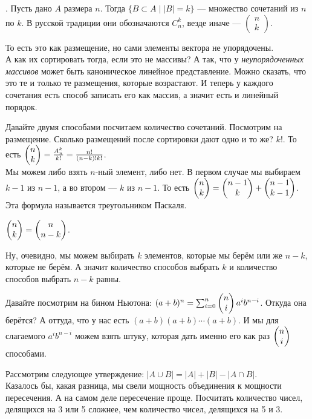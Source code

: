 \documentclass{article}
\begin{document}
\begin{itemize}
\begin{Example}
        \end{Example}
        \dfn {}. Пусть дано $A$ размера $n$. Тогда $\{B\subset A\mid |B|=k\}$ --- множество сочетаний из $n$ по $k$. В русской традиции они обозначаются $C_n^k$, везде иначе --- $\left(\begin{matrix}
            n\\k
        \end{matrix}\right)$.
        \begin{Comment}
            То есть это как размещение, но сами элементы вектора не упорядочены.\\
            А как их сортировать тогда, если это не массивы? А так, что у \textit{неупорядоченных массивов} может быть каноническое линейное представление. Можно сказать, что это те и только те размещения, которые возрастают. И теперь у каждого сочетания есть способ записать его как массив, а значит есть и линейный порядок.
        \end{Comment}
        \begin{Comment}
            Давайте двумя способами посчитаем количество сочетаний. Посмотрим на размещение. Сколько размещений после сортировки дают одно и то же? $k!$. То есть $\left(\begin{matrix}n\\k\end{matrix}\right)=\frac{A_n^k}{k!}=\frac{n!}{(n-k)!k!}$.\\
            Мы можем либо взять $n$-ный элемент, либо нет. В первом случае мы выбираем $k-1$ из $n-1$, а во втором --- $k$ из $n-1$. То есть $\left(\begin{matrix}n\\k\end{matrix}\right)=\left(\begin{matrix}n-1\\k\end{matrix}\right)+\left(\begin{matrix}n-1\\k-1\end{matrix}\right)$. Эта формула называется треугольником Паскаля.
        \end{Comment}
        \thm $\left(\begin{matrix}n\\k\end{matrix}\right)=\left(\begin{matrix}n\\n-k\end{matrix}\right)$.
        \begin{Proof}
            Ну, очевидно, мы можем выбирать $k$ элементов, которые мы берём или же $n-k$, которые не берём. А значит количество способов выбрать $k$ и количество способов выбрать $n-k$ равны.
        \end{Proof}
        \begin{Comment}
            Давайте посмотрим на бином Ньютона: $(a+b)^n=\sum_{i=0}^n\left(\begin{matrix}n\\i\end{matrix}\right)a^ib^{n-i}$. Откуда она берётся? А оттуда, что у нас есть $(a+b)(a+b)\cdots(a+b)$. И мы для слагаемого $a^ib^{n-i}$ можем взять штуку, которая дать именно его как раз $\left(\begin{matrix}n\\i\end{matrix}\right)$ способами.
        \end{Comment}
        \begin{Example}
            Рассмотрим следующее утверждение: $|A\cup B|=|A|+|B|-|A\cap B|$.\\
            Казалось бы, какая разница, мы свели мощность объединения к мощности пересечения. А на самом деле пересечение проще. Посчитать количество чисел, делящихся на 3 или 5 сложнее, чем количество чисел, делящихся на 5 и 3.

\end{Example}
\end{itemize}
\end{document}
